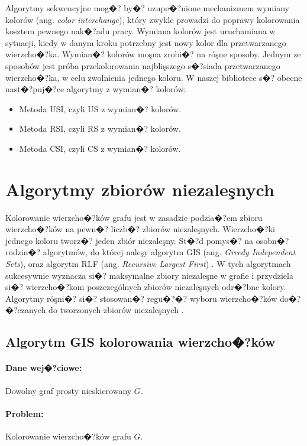 \documentclass[12pt,a4paper]{mwrep}
\begin{document}
Algorytmy sekwencyjne mog�? by�? uzupe�?nione mechanizmem
wymiany kolorów (ang. \emph{color interchange}), który zwykle
prowadzi do poprawy kolorowania kosztem pewnego nak�?adu pracy.
Wymiana kolorów jest uruchamiana w sytuacji, kiedy w danym
kroku potrzebny jest nowy kolor dla przetwarzanego wierzcho�?ka.
Wymian�? kolorów moşna zrobi�? na róşne sposoby.
Jednym ze sposobów jest próba przekolorowania najblişszego s�?siada
przetwarzanego wierzcho�?ka, w celu zwolnienia jednego koloru.
W naszej bibliotece s�? obecne nast�?puj�?ce algorytmy
z wymian�? kolorów:

\begin{itemize}
\item
Metoda USI, czyli US z wymian�? kolorów.
\item
Metoda RSI, czyli RS z wymian�? kolorów.
\item
Metoda CSI, czyli CS z wymian�? kolorów.
\end{itemize}


\section{Algorytmy zbiorów niezaleşnych}
\label{sec:iset_node_coloring}

Kolorowanie wierzcho�?ków grafu jest w zasadzie podzia�?em
zbioru wierzcho�?ków na pewn�? liczb�? zbiorów niezaleşnych.
Wierzcho�?ki jednego koloru tworz�? jeden zbiór niezaleşny.
St�?d pomys�? na osobn�? rodzin�? algorytmów, do której naleşy
algorytm GIS (ang. \emph{Greedy Independent Sets}), oraz
algorytm RLF (ang. \emph{Recursive Largest First})
\cite{1979_Leighton}.
W tych algorytmach sukcesywnie wyznacza si�? maksymalne
zbiory niezaleşne w grafie i przydziela si�? wierzcho�?kom
poszczególnych zbiorów niezaleşnych odr�?bne kolory.
Algorytmy róşni�? si�? stosowan�? regu�?�? wyboru wierzcho�?ków
do�?�?czanych do tworzonych zbiorów niezaleşnych
\cite{Wojciechowski}.

\subsection{Algorytm GIS kolorowania wierzcho�?ków}
\label{sec:algorytm_GIS}

\paragraph{Dane wej�?ciowe:} Dowolny graf prosty nieskierowany $G$.

\paragraph{Problem:} Kolorowanie wierzcho�?ków grafu $G$.
\end{document}
